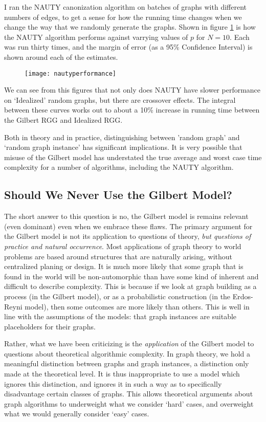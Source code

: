 I ran the NAUTY canonization algorithm on batches of graphs with different numbers of edges, to get a sense for how the running time changes when we change the way that we randomly generate the graphs.
Shown in figure \ref{fig:nautyperformance10} is how the NAUTY algorithm performs against varrying values of $p$ for $N=10$.
Each was run thirty times, and the margin of error (as a 95\% Confidence Interval) is shown around each of the estimates.

\begin{figure}[h]
\caption{}
\centering
\texttt{[image: nautyperformance]}
\label{fig:nautyperformance10}
\end{figure}

We can see from this figures that not only does NAUTY have slower performance on `Idealized' random graphs, but there are crossover effects.
The integral between these curves works out to about a 10\% increase in running time between the Gilbert RGG and Idealized RGG.

Both in theory and in practice, distinguishing between 'random graph' and `random graph instance' has significant implications.
It is very possible that misuse of the Gilbert model has understated the true average and worst case time complexity for a number of algorithms, including the NAUTY algorithm.

\subsection{Should We Never Use the Gilbert Model?}

The short answer to this question is no, the Gilbert model is remains relevant (even dominant) even when we embrace these flaws.
The primary argument for the Gilbert model is not its application to questions of theory, \emph{but questions of practice and natural occurrence}.
Most applications of graph theory to world problems are based around structures that are naturally arising, without centralized planing or design.
It is much more likely that some graph that is found in the world will be non-automorphic than have some kind of inherent and difficult to describe complexity.
This is because if we look at graph building as a process (in the Gilbert model), or as a probabilistic construction (in the Erdos-Reyni model), then some outcomes are more likely than others.
This is well in line with the assumptions of the models: that graph instances are suitable placeholders for their graphs.

Rather, what we have been criticizing is the \emph{application} of the Gilbert model to questions about theoretical algorithmic complexity.
In graph theory, we hold a meaningful distinction between graphs and graph instances, a distinction only made at the theoretical level.
It is thus inappropriate to use a model which ignores this distinction, and ignores it in such a way as to specifically disadvantage certain classes of graphs.
This allows theoretical arguments about graph algorithms to underweight what we consider `hard' cases, and overweight what we would generally consider `easy' cases.

